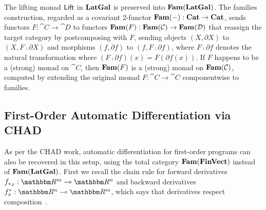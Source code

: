 The lifting monad $\mathsf{Lift}$ in $\mathbf{LatGal}$ is preserved into $\mathbf{Fam}(\mathbf{LatGal})$. The families construction, regarded
as a covariant 2-functor $\mathbf{Fam}(-): \mathbf{Cat} \to \mathbf{Cat}$, sends functors $F: \cat{C} \to \cat{D}$ to functors
$\mathbf{Fam}(F): \mathbf{Fam}(\mathcal{C}) \to \mathbf{Fam}(\mathcal{D})$ that reassign the target category by postcomposing with $F$,
sending objects $(X, \partial X)$ to $(X, F \comp \partial X)$ and morphisms $(f, \partial f)$ to $(f, F \comp
\partial f)$, where $F \comp \partial f$ denotes the natural transformation where $(F \comp \partial f)(x) =
F(\partial f(x))$. If $F$ happens to be a (strong) monad on $\cat{C}$, then $\mathbf{Fam}(F)$ is a (strong) monad on
$\mathbf{Fam}(\mathcal{C})$, computed by extending the original monad $F: \cat{C} \to \cat{C}$ componentwise to families.

\subsection{First-Order Automatic Differentiation via CHAD}
\label{sec:first-order:autodiff}

As per the CHAD work, automatic differentiation for first-order programs can also be recovered in this setup,
using the total category $\mathbf{Fam}(\mathbf{FinVect})$ instead of $\mathbf{Fam}(\mathbf{LatGal})$. First we recall the chain rule for
forward derivatives $\pushf{f}_x: \RR^m \linearto \RR^n$ and backward derivatives $\pullf{f}_x: \RR^n
\linearto \RR^m$, which says that derivatives respect composition~\cite{spivak65}.

%
%

